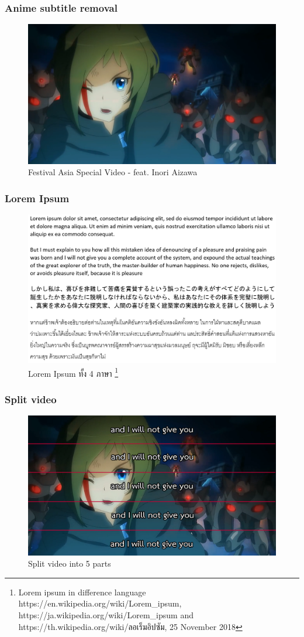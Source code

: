\documentclass[xcolor=dvipsnames, xetex,serif]{beamer}
\begin{document}
    \begin{frame}
        \frametitle{Anime subtitle removal}
        \begin{figure}[H]
            \centering
            \includegraphics[width=0.8\linewidth]{images/inori-preview.png}
            \caption{ Festival Asia Special Video - feat. Inori Aizawa }
        \end{figure}
    \end{frame}
    \begin{frame}
        \frametitle{Lorem Ipsum}
            \begin{figure}[H]
            \centering
            \includegraphics[width=0.85\linewidth]{images/lorem4lang.png}
            \caption{Lorem Ipsum ทั้ง 4 ภาษา \footnote{ \tiny{Lorem ipsum in difference language https://en.wikipedia.org/wiki/Lorem\_ipsum,  https://ja.wikipedia.org/wiki/Lorem\_ipsum and  https://th.wikipedia.org/wiki/ลอเร็มอิปซัม, 25 November 2018} } }
        \end{figure}
    \end{frame}
    \begin{frame}
        \frametitle{Split video}
            \begin{figure}[H]
            \centering
            \includegraphics[width=0.8\linewidth]{images/inori-subbed-preview.png}
            \caption{Split video into 5 parts}
        \end{figure}
    \end{frame}
\end{document}
